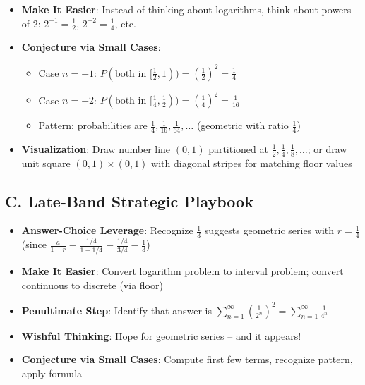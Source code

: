 \documentclass[11pt]{article}
\begin{document}
\begin{strategicbox}
\begin{itemize}[leftmargin=*]
    \item \textbf{Make It Easier}: Instead of thinking about logarithms, think about powers of 2: $2^{-1} = \frac{1}{2}$, $2^{-2} = \frac{1}{4}$, etc.
    
    \item \textbf{Conjecture via Small Cases}: 
    \begin{itemize}
        \item Case $n=-1$: $P(\text{both in } [\frac{1}{2},1)) = (\frac{1}{2})^2 = \frac{1}{4}$
        \item Case $n=-2$: $P(\text{both in } [\frac{1}{4},\frac{1}{2})) = (\frac{1}{4})^2 = \frac{1}{16}$
        \item Pattern: probabilities are $\frac{1}{4}, \frac{1}{16}, \frac{1}{64}, \ldots$ (geometric with ratio $\frac{1}{4}$)
    \end{itemize}
    
    \item \textbf{Visualization}: Draw number line $(0,1)$ partitioned at $\frac{1}{2}, \frac{1}{4}, \frac{1}{8}, \ldots$; or draw unit square $(0,1) \times (0,1)$ with diagonal stripes for matching floor values
\end{itemize}

\subsection*{C. Late-Band Strategic Playbook}
\begin{itemize}[leftmargin=*]
    \item \textbf{Answer-Choice Leverage}: Recognize $\frac{1}{3}$ suggests geometric series with $r = \frac{1}{4}$ (since $\frac{a}{1-r} = \frac{1/4}{1-1/4} = \frac{1/4}{3/4} = \frac{1}{3}$)
    
    \item \textbf{Make It Easier}: Convert logarithm problem to interval problem; convert continuous to discrete (via floor)
    
    \item \textbf{Penultimate Step}: Identify that answer is $\sum_{n=1}^{\infty} (\frac{1}{2^n})^2 = \sum_{n=1}^{\infty} \frac{1}{4^n}$
    
    \item \textbf{Wishful Thinking}: Hope for geometric series -- and it appears!
    
    \item \textbf{Conjecture via Small Cases}: Compute first few terms, recognize pattern, apply formula
\end{itemize}


\end{strategicbox}
\end{document}
